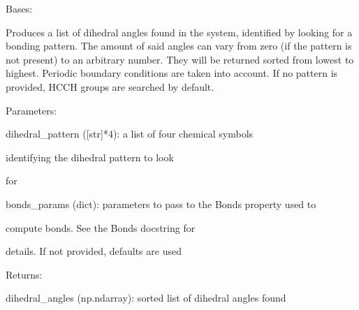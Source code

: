 \documentclass[letterpaper,10pt,english]{sphinxmanual}
\begin{document}
\begin{fulllineitems}
\label{doctree/soprano.properties.linkage.linkage:soprano.properties.linkage.linkage.DihedralAngleList}
Bases: {\hyperref[doctree/soprano.properties.atomsproperty:soprano.properties.atomsproperty.AtomsProperty]{\emph{}}}

Produces a list of dihedral angles found in the system, identified by 
looking for a bonding pattern. The amount of said angles can vary from
zero (if the pattern is not present) to an arbitrary number. They will be
returned sorted from lowest to highest. Periodic boundary conditions are
taken into account. If no pattern is provided, HCCH groups are searched by
default.

\begin{DUlineblock}{0em}
\item[] Parameters:
\item[]
\begin{DUlineblock}{\DUlineblockindent}
\item[] dihedral\_pattern ({[}str{]}*4): a list of four chemical symbols
\item[]
\begin{DUlineblock}{\DUlineblockindent}
\item[] identifying the dihedral pattern to look
\item[] for
\end{DUlineblock}
\item[] bonds\_params (dict): parameters to pass to the Bonds property used to
\item[]
\begin{DUlineblock}{\DUlineblockindent}
\item[] compute bonds. See the Bonds docstring for
\item[] details. If not provided, defaults are used
\end{DUlineblock}
\end{DUlineblock}
\end{DUlineblock}

\begin{DUlineblock}{0em}
\item[] Returns:
\item[]
\begin{DUlineblock}{\DUlineblockindent}
\item[] dihedral\_angles (np.ndarray): sorted list of dihedral angles found
\end{DUlineblock}
\end{DUlineblock}


\end{fulllineitems}
\end{document}
